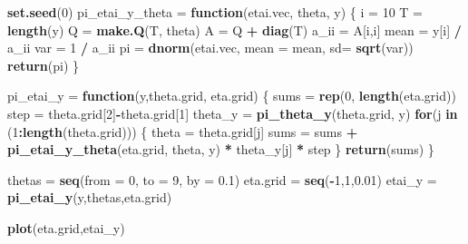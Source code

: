 \documentclass[
]{article}
\newenvironment{Shaded}{\begin{snugshade}}{\end{snugshade}}
\newcommand{\ControlFlowTok}[1]{\textcolor[rgb]{0.13,0.29,0.53}{\textbf{#1}}}
\newcommand{\DataTypeTok}[1]{\textcolor[rgb]{0.13,0.29,0.53}{#1}}
\newcommand{\DecValTok}[1]{\textcolor[rgb]{0.00,0.00,0.81}{#1}}
\newcommand{\FloatTok}[1]{\textcolor[rgb]{0.00,0.00,0.81}{#1}}
\newcommand{\KeywordTok}[1]{\textcolor[rgb]{0.13,0.29,0.53}{\textbf{#1}}}
\newcommand{\NormalTok}[1]{#1}
\newcommand{\OperatorTok}[1]{\textcolor[rgb]{0.81,0.36,0.00}{\textbf{#1}}}
\newcommand{\StringTok}[1]{\textcolor[rgb]{0.31,0.60,0.02}{#1}}
\begin{document}
\begin{Shaded}
\begin{Highlighting}[]
\KeywordTok{set.seed}\NormalTok{(}\DecValTok{0}\NormalTok{)}
\NormalTok{pi_etai_y_theta =}\StringTok{ }\ControlFlowTok{function}\NormalTok{(etai.vec, theta, y) \{}
\NormalTok{  i =}\StringTok{ }\DecValTok{10}
\NormalTok{  T =}\StringTok{ }\KeywordTok{length}\NormalTok{(y)}
\NormalTok{  Q =}\StringTok{ }\KeywordTok{make.Q}\NormalTok{(T, theta)}
\NormalTok{  A =}\StringTok{ }\NormalTok{Q }\OperatorTok{+}\StringTok{ }\KeywordTok{diag}\NormalTok{(T)}
\NormalTok{  a_ii =}\StringTok{ }\NormalTok{A[i,i]}
\NormalTok{  mean =}\StringTok{ }\NormalTok{y[i] }\OperatorTok{/}\StringTok{ }\NormalTok{a_ii}
\NormalTok{  var =}\StringTok{ }\DecValTok{1} \OperatorTok{/}\StringTok{ }\NormalTok{a_ii}
\NormalTok{  pi =}\StringTok{ }\KeywordTok{dnorm}\NormalTok{(etai.vec, }\DataTypeTok{mean =}\NormalTok{ mean, }\DataTypeTok{sd=} \KeywordTok{sqrt}\NormalTok{(var))}
  \KeywordTok{return}\NormalTok{(pi)}
\NormalTok{\}}


\NormalTok{pi_etai_y =}\StringTok{ }\ControlFlowTok{function}\NormalTok{(y,theta.grid, eta.grid) \{}
\NormalTok{  sums =}\StringTok{ }\KeywordTok{rep}\NormalTok{(}\DecValTok{0}\NormalTok{, }\KeywordTok{length}\NormalTok{(eta.grid))}
\NormalTok{  step =}\StringTok{ }\NormalTok{theta.grid[}\DecValTok{2}\NormalTok{]}\OperatorTok{-}\NormalTok{theta.grid[}\DecValTok{1}\NormalTok{]}
\NormalTok{  theta_y =}\StringTok{ }\KeywordTok{pi_theta_y}\NormalTok{(theta.grid, y)}
  \ControlFlowTok{for}\NormalTok{(j }\ControlFlowTok{in}\NormalTok{ (}\DecValTok{1}\OperatorTok{:}\KeywordTok{length}\NormalTok{(theta.grid))) \{}
\NormalTok{    theta =}\StringTok{ }\NormalTok{theta.grid[j]}
\NormalTok{    sums =}\StringTok{ }\NormalTok{sums }\OperatorTok{+}\StringTok{ }\KeywordTok{pi_etai_y_theta}\NormalTok{(eta.grid, theta, y) }\OperatorTok{*}\StringTok{ }\NormalTok{theta_y[j] }\OperatorTok{*}\StringTok{ }\NormalTok{step}
\NormalTok{  \}}
  \KeywordTok{return}\NormalTok{(sums)}
\NormalTok{\}}


\NormalTok{thetas =}\StringTok{ }\KeywordTok{seq}\NormalTok{(}\DataTypeTok{from =} \DecValTok{0}\NormalTok{, }\DataTypeTok{to =} \DecValTok{9}\NormalTok{, }\DataTypeTok{by =} \FloatTok{0.1}\NormalTok{)}
\NormalTok{eta.grid =}\StringTok{ }\KeywordTok{seq}\NormalTok{(}\OperatorTok{-}\DecValTok{1}\NormalTok{,}\DecValTok{1}\NormalTok{,}\FloatTok{0.01}\NormalTok{)}
\NormalTok{etai_y =}\StringTok{ }\KeywordTok{pi_etai_y}\NormalTok{(y,thetas,eta.grid)}

\KeywordTok{plot}\NormalTok{(eta.grid,etai_y)}
\end{Highlighting}
\end{Shaded}
\end{document}
